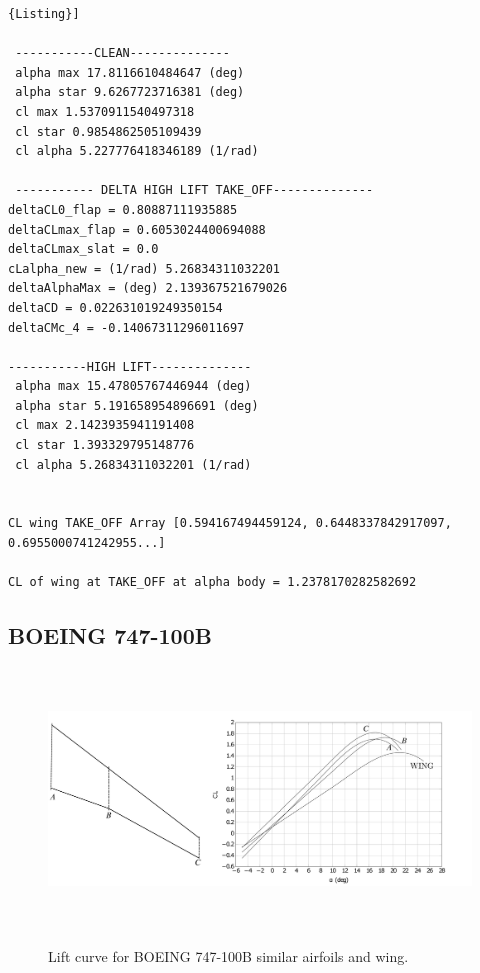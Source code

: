 \begin{lstlisting}[caption={{\footnotesize Wing Lift characteristic results for TAKE-OFF. ATR-72, M=0.2 }},label= [style=\bfseries]{Listing}]

 -----------CLEAN-------------- 
 alpha max 17.8116610484647 (deg)
 alpha star 9.6267723716381 (deg)
 cl max 1.5370911540497318
 cl star 0.9854862505109439
 cl alpha 5.227776418346189 (1/rad)

 ----------- DELTA HIGH LIFT TAKE_OFF-------------- 
deltaCL0_flap = 0.80887111935885
deltaCLmax_flap = 0.6053024400694088
deltaCLmax_slat = 0.0
cLalpha_new = (1/rad) 5.26834311032201
deltaAlphaMax = (deg) 2.139367521679026
deltaCD = 0.022631019249350154
deltaCMc_4 = -0.14067311296011697

-----------HIGH LIFT-------------- 
 alpha max 15.47805767446944 (deg)
 alpha star 5.191658954896691 (deg)
 cl max 2.1423935941191408
 cl star 1.393329795148776
 cl alpha 5.26834311032201 (1/rad)


CL wing TAKE_OFF Array [0.594167494459124, 0.6448337842917097, 0.6955000741242955...]

CL of wing at TAKE_OFF at alpha body = 1.2378170282582692

\end{lstlisting}


\subsection{BOEING 747-100B}

\begin{figure}[H]
	\centering
	{\includegraphics[height=6.9cm]{Immagini/BOEING_Topview.pdf}} 
	\caption{Lift curve for BOEING 747-100B similar airfoils and wing.}
	\label{fig:clalf}
\end{figure}

